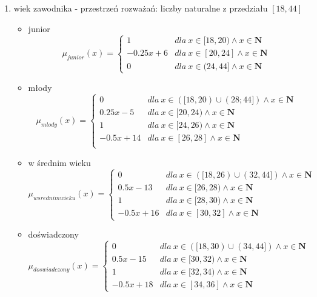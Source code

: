 \documentclass{classrep}
\begin{document}
\begin{enumerate}
    \item wiek zawodnika - przestrzeń rozważań: liczby naturalne z przedziału $[18, 44]$
    \begin{itemize}
        \item junior
        \begin{equation}
            \mu_{junior}(x) = \left\{\begin{matrix} 1 & dla \: x\in[18, 20) \wedge x\in \mathbf{N} \\ -0.25x + 6 & dla \: x\in [20, 24] \wedge x\in \mathbf{N} \\ 0 & dla \: x\in (24, 44] \wedge x\in \mathbf{N} \end{matrix}\right.
        \end{equation}
        \item młody
        \begin{equation}
            \mu_{mlody}(x) = \left\{\begin{matrix}  0 & dla \: x\in ([18, 20) \cup (28;44])  \wedge x\in \mathbf{N} \\ 0.25x-5 & dla \: x\in[20, 24) \wedge x\in \mathbf{N} \\ 1 & dla \: x\in [24, 26) \wedge x\in \mathbf{N} \\ -0.5x + 14 & dla \: x\in[26, 28] \wedge x\in \mathbf{N} \\\end{matrix}\right.
        \end{equation}
        \item w średnim wieku
        \begin{equation}
            \mu_{w srednim wieku}(x) = \left\{\begin{matrix} 0 & dla \: x\in ([18, 26) \cup (32, 44] ) \wedge x\in \mathbf{N} \\ 0.5x - 13 & dla \: x\in[26, 28) \wedge x\in \mathbf{N} \\ 1 & dla \: x\in [28, 30) \wedge x\in \mathbf{N} \\ -0.5x + 16 & dla \: x\in[30, 32] \wedge x\in \mathbf{N}  \end{matrix}\right.
        \end{equation}
        \item doświadczony
        \begin{equation}
            \mu_{doswiadczony}(x) = \left\{\begin{matrix}  0 & dla \: x\in ([18, 30) \cup  (34, 44] )  \wedge x\in \mathbf{N} \\ 0.5x - 15 & dla \: x\in[30, 32)  \wedge x\in \mathbf{N}\\ 1 & dla \: x\in [32, 34) \wedge x\in \mathbf{N} \\ -0.5x + 18 & dla \: x\in[34, 36]  \wedge x\in \mathbf{N} \end{matrix}\right.

\end{equation}
\end{itemize}
\end{enumerate}
\end{document}
